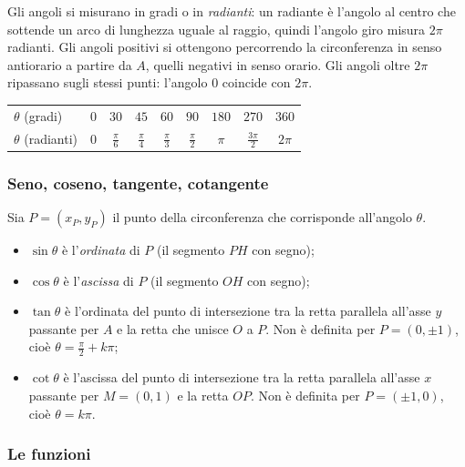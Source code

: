 \documentclass[11pt,a4paper]{article}
\begin{document}
Gli angoli si misurano in gradi o in \emph{radianti}: un radiante è l'angolo al centro che sottende un arco di lunghezza uguale al raggio, quindi l'angolo giro misura $2\pi$ radianti. Gli angoli positivi si ottengono percorrendo la circonferenza in senso antiorario a partire da $A$, quelli negativi in senso orario. Gli angoli oltre $2\pi$ ripassano sugli stessi punti: l'angolo $0$ coincide con $2\pi$.

\begin{center}
\renewcommand{\arraystretch}{1.2}
\begin{tabular}{@{}l|cccccccc@{}}
\toprule
$\theta$ (gradi) & $0$ & $30$ & $45$ & $60$ & $90$ & $180$ & $270$ & $360$ \\
$\theta$ (radianti) & $0$ & $\frac{\pi}{6}$ & $\frac{\pi}{4}$ & $\frac{\pi}{3}$ & $\frac{\pi}{2}$ & $\pi$ & $\frac{3\pi}{2}$ & $2\pi$ \\
\bottomrule
\end{tabular}
\end{center}

\subsubsection{Seno, coseno, tangente, cotangente}

Sia $P = (x_P, y_P)$ il punto della circonferenza che corrisponde all'angolo $\theta$.
\begin{itemize}
    \item $\sin\theta$ è l'\emph{ordinata} di $P$ (il segmento $PH$ con segno);
    \item $\cos\theta$ è l'\emph{ascissa} di $P$ (il segmento $OH$ con segno);
    \item $\tan\theta$ è l'ordinata del punto di intersezione tra la retta parallela all'asse $y$ passante per $A$ e la retta che unisce $O$ a $P$. Non è definita per $P = (0, \pm 1)$, cioè $\theta = \frac{\pi}{2} + k\pi$;
    \item $\cot\theta$ è l'ascissa del punto di intersezione tra la retta parallela all'asse $x$ passante per $M = (0, 1)$ e la retta $OP$. Non è definita per $P = (\pm 1, 0)$, cioè $\theta = k\pi$.
\end{itemize}

\subsubsection{Le funzioni}
\end{document}
